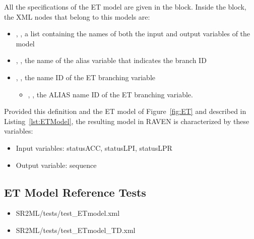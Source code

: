 All the specifications of the ET model are given in the
 block.
Inside the  block, the XML
nodes that belong to this models are:
\begin{itemize}
  \item  {}, , a list containing the names of both the input and output variables of the model
  \item  {}, , the name of the alias variable that indicates the branch ID
  \item  {}, , the name ID of the ET branching variable
	  \begin{itemize}
	    \item {}, , the ALIAS name ID of the ET branching variable.
	  \end{itemize}
\end{itemize}

Provided this definition and the ET model of Figure~\ref{fig:ET} and described in Listing~\ref{lst:ETModel},
the resulting model in RAVEN is characterized by these variables:
\begin{itemize}
	\item Input variables: statusACC, statusLPI, statusLPR
	\item Output variable: sequence
\end{itemize}

\subsection{ET Model Reference Tests}
\begin{itemize}
	\item SR2ML/tests/test\_ETmodel.xml
	\item SR2ML/tests/test\_ETmodel\_TD.xml
\end{itemize}
